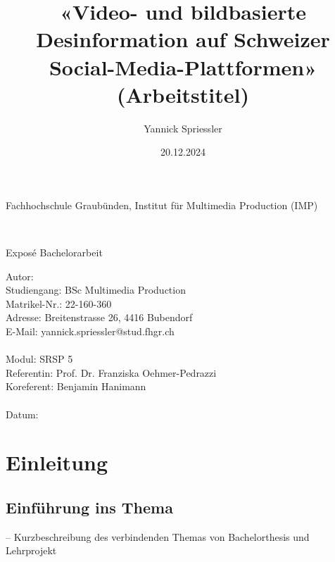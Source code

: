 \documentclass[12pt,a4paper]{article}        %
\title{«Video- und bildbasierte Desinformation auf Schweizer Social-Media-Plattformen» (Arbeitstitel)}        %
\author{Yannick Spriessler}     %
\date{20.12.2024}     %
\begin{document}
\begin{titlingpage} %
  \begin{center}
    \begin{large}
      Fachhochschule Graubünden, Institut für Multimedia Production (IMP)\\ %
    \end{large}
    \vspace{2cm} %
    \begin{LARGE}
      \textbf{\thetitle} \\
    \end{LARGE}
    \vspace{1cm}
    \begin{large}
      Exposé Bachelorarbeit\\
    \end{large}
    \vspace{5cm} %
    Autor: \theauthor \\
    Studiengang: BSc Multimedia Production \\
    Matrikel-Nr.: 22-160-360 \\
    Adresse: Breitenstrasse 26, 4416 Bubendorf \\
    E-Mail: yannick.spriessler@stud.fhgr.ch \\ \\
    Modul: SRSP 5 \\
    Referentin: Prof. Dr. Franziska Oehmer-Pedrazzi \\
    Koreferent: Benjamin Hanimann \\ \\
    Datum: \thedate
  \end{center}
\end{titlingpage}


\section{Einleitung}
\subsection{Einführung ins Thema}
– Kurzbeschreibung des verbindenden Themas von Bachelorthesis und Lehrprojekt\\
\end{document}
